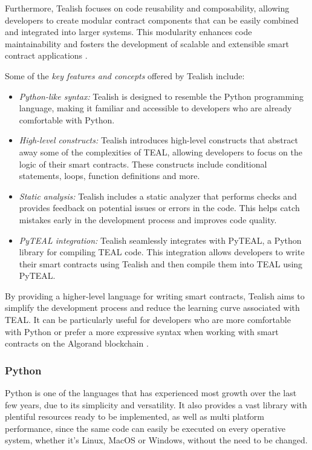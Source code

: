 Furthermore, Tealish focuses on code reusability and composability, allowing developers to create modular contract components that can be easily combined and integrated into larger systems. This modularity enhances code maintainability and fosters the development of scalable and extensible smart contract applications \cite{tealish}.\newline

Some of the \textit{key features and concepts} offered by Tealish include:

\begin{itemize}
    \item \textit{Python-like syntax:} Tealish is designed to resemble the Python programming language, making it familiar and accessible to developers who are already comfortable with Python.
    \item \textit{High-level constructs:} Tealish introduces high-level constructs that abstract away some of the complexities of TEAL, allowing developers to focus on the logic of their smart contracts. These constructs include conditional statements, loops, function definitions and more.
    \item \textit{Static analysis:} Tealish includes a static analyzer that performs checks and provides feedback on potential issues or errors in the code. This helps catch mistakes early in the development process and improves code quality.
    \item \textit{PyTEAL integration:} Tealish seamlessly integrates with PyTEAL, a Python library for compiling TEAL code. This integration allows developers to write their smart contracts using Tealish and then compile them into TEAL using PyTEAL.
\end{itemize}

By providing a higher-level language for writing smart contracts, Tealish aims to simplify the development process and reduce the learning curve associated with TEAL. It can be particularly useful for developers who are more comfortable with Python or prefer a more expressive syntax when working with smart contracts on the Algorand blockchain \cite{tealish}.

\subsubsection{Python}\label{python}

Python is one of the languages that has experienced most growth over the last few years, due to its simplicity and versatility. It also provides a vast library with plentiful resources ready to be implemented, as well as multi platform performance, since the same code can easily be executed on every operative system, whether it's Linux, MacOS or Windows, without the need to be changed.\newline

